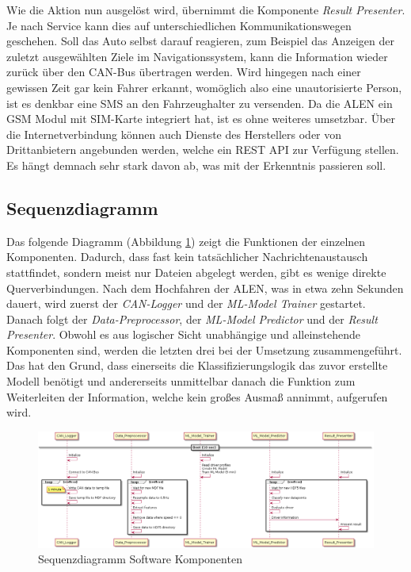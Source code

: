 Wie die Aktion nun ausgelöst wird, übernimmt die Komponente \textit{Result Presenter}. Je nach Service kann dies auf unterschiedlichen Kommunikationswegen geschehen. Soll das Auto selbst darauf reagieren, zum Beispiel das Anzeigen der zuletzt ausgewählten Ziele im Navigationssystem, kann die Information wieder zurück über den CAN-Bus übertragen werden. Wird hingegen nach einer gewissen Zeit gar kein Fahrer erkannt, womöglich also eine unautorisierte Person, ist es denkbar eine SMS an den Fahrzeughalter zu versenden. Da die ALEN ein GSM Modul mit SIM-Karte integriert hat, ist es ohne weiteres umsetzbar. Über die Internetverbindung können auch Dienste des Herstellers oder von Drittanbietern angebunden werden, welche ein REST API zur Verfügung stellen. Es hängt demnach sehr stark davon ab, was mit der Erkenntnis passieren soll.

\subsection{Sequenzdiagramm}

Das folgende Diagramm (Abbildung \ref{fig:sw_components_sequence}) zeigt die Funktionen der einzelnen Komponenten. Dadurch, dass fast kein tatsächlicher Nachrichtenaustausch stattfindet, sondern meist nur Dateien abgelegt werden, gibt es wenige direkte Querverbindungen. Nach dem Hochfahren der ALEN, was in etwa zehn Sekunden dauert, wird zuerst der \textit{CAN-Logger} und der \textit{ML-Model Trainer} gestartet. Danach folgt der \textit{Data-Preprocessor}, der \textit{ML-Model Predictor} und der \textit{Result Presenter}. Obwohl es aus logischer Sicht unabhängige und alleinstehende Komponenten sind, werden die letzten drei bei der Umsetzung zusammengeführt. Das hat den Grund, dass einerseits die Klassifizierungslogik das zuvor erstellte Modell benötigt und andererseits unmittelbar danach die Funktion zum Weiterleiten der Information, welche kein großes Ausmaß annimmt, aufgerufen wird.

\begin{figure}[htbp]
	\centering
    \includegraphics[width=\textwidth]{images/sw_components_sequence.png}
	\caption{Sequenzdiagramm Software Komponenten}
	\label{fig:sw_components_sequence}
\end{figure}

